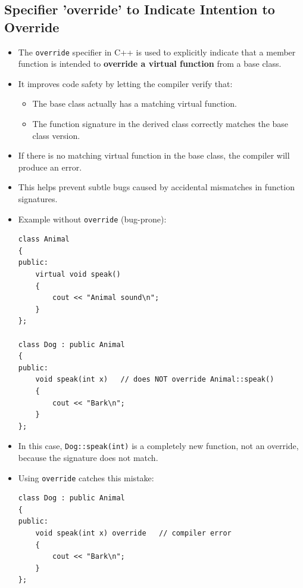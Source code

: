 \documentclass[10pt]{article}
\begin{document}
\newpage
\subsection{Specifier 'override' to Indicate Intention to Override}

\begin{itemize}
	\item The \texttt{override} specifier in C++ is used to explicitly indicate that a member function is intended to \textbf{override a virtual function} from a base class.

	\item It improves code safety by letting the compiler verify that:
	\begin{itemize}
		\item The base class actually has a matching virtual function.
		\item The function signature in the derived class correctly matches the base class version.
	\end{itemize}

	\item If there is no matching virtual function in the base class, the compiler will produce an error.

	\item This helps prevent subtle bugs caused by accidental mismatches in function signatures.

	\item Example without \texttt{override} (bug-prone):

\begin{verbatim}
class Animal
{
public:
    virtual void speak()
    {
        cout << "Animal sound\n";
    }
};

class Dog : public Animal
{
public:
    void speak(int x)   // does NOT override Animal::speak()
    {
        cout << "Bark\n";
    }
};
\end{verbatim}

	\item In this case, \texttt{Dog::speak(int)} is a completely new function, not an override, because the signature does not match.

	\item Using \texttt{override} catches this mistake:

\begin{verbatim}
class Dog : public Animal
{
public:
    void speak(int x) override   // compiler error
    {
        cout << "Bark\n";
    }
};
\end{verbatim}


\end{itemize}
\end{document}
